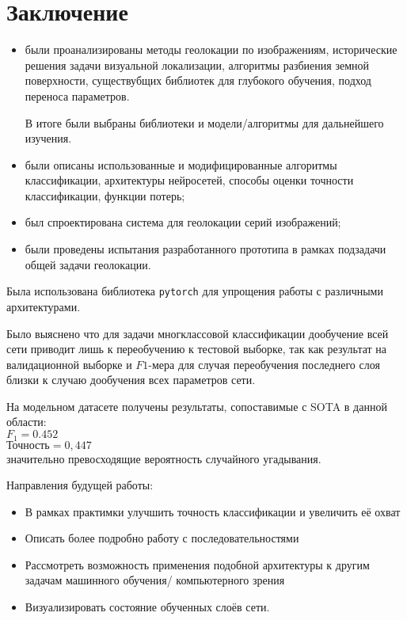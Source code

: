 \chapter*{Заключение}

\begin{itemize}
	\item были проанализированы методы геолокации по изображениям, исторические решения задачи визуальной локализации, алгоритмы разбиения земной поверхности, существубщих библиотек для глубокого обучения, подход переноса параметров.
	
	В итоге были выбраны библиотеки и модели/алгоритмы для дальнейшего изучения.
	
	\item были описаны использованные и модифицированные алгоритмы классификации, архитектуры нейросетей, способы оценки точности классификации, функции потерь;
	
	\item был спроектирована система для геолокации серий изображений;
	
	\item были проведены испытания разработанного прототипа в рамках подзадачи общей задачи геолокации.
\end{itemize}

Была использована библиотека \texttt{pytorch} для упрощения работы с различными архитектурами.

Было выяснено что для задачи многклассовой классификации дообучение всей сети приводит лишь
к переобучению к тестовой выборке, так как результат на валидационной выборке и $ F1 $-мера
для случая переобучения последнего слоя близки к случаю дообучения всех параметров сети.

На модельном датасете получены результаты, сопоставимые с SOTA в данной области:\\
$ F_1 = 0.452 $\\
$ \mbox{Точность} = 0,447 $\\
значительно превосходящие вероятность случайного угадывания.

Направления будущей работы:

\begin{itemize}
	\item В рамках практимки улучшить точность классификации и увеличить её охват
	
	\item Описать более подробно работу с последовательностями
	
	\item Рассмотреть возможность применения подобной архитектуры к другим задачам машинного обучения/ компьютерного зрения
	
	\item Визуализировать состояние обученных слоёв сети.
\end{itemize}